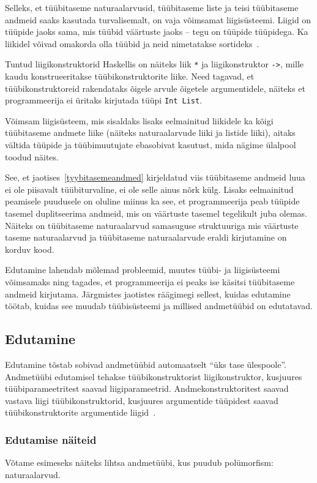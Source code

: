 \documentclass[12pt]{article}
\begin{document}
      Selleks, et tüübitaseme naturaalarvusid, tüübitaseme liste ja teisi tüübitaseme andmeid saaks kasutada turvalisemalt, on vaja võimsamat liigisüsteemi. Liigid on tüüpide jaoks sama, mis tüübid väärtuste jaoks -- tegu on tüüpide tüüpidega. Ka liikidel võivad omakorda olla tüübid ja neid nimetatakse sortideks~\cite{Typ}.

      Tuntud liigikonstruktorid Haskellis on näiteks liik \verb!*! ja liigikonstruktor \verb!->!, mille kaudu konstrueeritakse tüübikonstruktorite liike. Need tagavad, et tüübikonstruktoreid rakendataks õigele arvule õigetele argumentidele, näiteks et programmeerija ei üritaks kirjutada tüüpi \verb!Int List!.

      Võimsam liigisüsteem, mis sisaldaks lisaks eelmainitud liikidele ka kõigi tüübitaseme andmete liike (näiteks naturaalarvude liiki ja listide liiki), aitaks vältida tüüpide ja tüübimuutujate ebasobivat kasutust, mida nägime ülalpool toodud näites.

      See, et jaotises~\ref{tyybitasemeandmed} kirjeldatud viis tüübitaseme andmeid luua ei ole piisavalt tüübiturvaline, ei ole selle ainus nõrk külg. Lisaks eelmainitud peamisele puudusele on oluline miinus ka see, et programmeerija peab tüüpide tasemel duplitseerima andmeid, mis on väärtuste tasemel tegelikult juba olemas. Näiteks on tüübitaseme naturaalarvud samasuguse struktuuriga mis väärtuste taseme naturaalarvud ja tüübitaseme naturaalarvude eraldi kirjutamine on korduv kood.

      Edutamine lahendab mõlemad probleemid, muutes tüübi- ja liigisüsteemi võimsamaks ning tagades, et programmeerija ei peaks ise käsitsi tüübitaseme andmeid kirjutama. Järgmistes jaotistes räägimegi sellest, kuidas edutamine töötab, kuidas see muudab tüübisüsteemi ja millised andmetüübid on edutatavad.
    \subsection{Edutamine}
      Edutamine tõstab sobivad andmetüübid automaatselt "`üks tase ülespoole"'. Andmetüübi edutamisel tehakse tüübikonstruktorist liigikonstruktor, kusjuures tüübiparameetritest saavad liigiparameetrid. Andmekonstruktoritest saavad vastava liigi tüübikonstruktorid, kusjuures argumentide tüüpidest saavad tüübikonstruktorite argumentide liigid~\cite{Giv}.
      \subsubsection{Edutamise näiteid}
        Võtame esimeseks näiteks lihtsa andmetüübi, kus puudub polümorfism: naturaalarvud.
\end{document}

